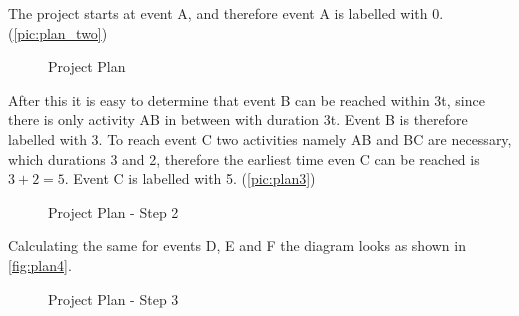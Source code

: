 The project starts at event A, and therefore event A is labelled with 0. (\autoref{pic:plan_two})
\begin{figure}[h] 
\centerline{}
\caption{Project Plan}
\label{pic:plan_two}
\end{figure}
After this it is easy to determine that event B can be reached within 3t, since there is only activity AB in between with duration 3t. Event B is therefore labelled with 3.
To reach event C two activities namely AB and BC are necessary, which durations 3 and 2, therefore the earliest time even C can be reached is $3+2 = 5$. Event C is labelled with 5. (\autoref{pic:plan3})
\begin{figure}[h] 
\centerline{}
\caption{Project Plan - Step 2}
\label{pic:plan3}
\end{figure}

Calculating the same for events D, E and F the diagram looks as shown in \autoref{fig:plan4}.
\begin{figure}[h] 
\centerline{}
\caption{Project Plan - Step 3}
\label{fig:plan4}
\end{figure}

